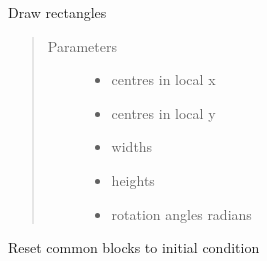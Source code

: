 \documentclass[letterpaper,10pt,english]{sphinxmanual}
\begin{document}
\begin{fulllineitems}
\label{\detokenize{images_functions:images.rectangles}}
Draw rectangles
\begin{quote}\begin{description}
\item[{Parameters}] \leavevmode\begin{itemize}
\item {} 
 \textendash{} centres in local x

\item {} 
 \textendash{} centres in local y

\item {} 
 \textendash{} widths

\item {} 
 \textendash{} heights

\item {} 
 \textendash{} rotation angles radians

\end{itemize}

\end{description}\end{quote}

\end{fulllineitems}


\begin{fulllineitems}
\label{\detokenize{images_functions:images.reset}}
Reset common blocks to initial condition

\end{fulllineitems}

\end{document}

